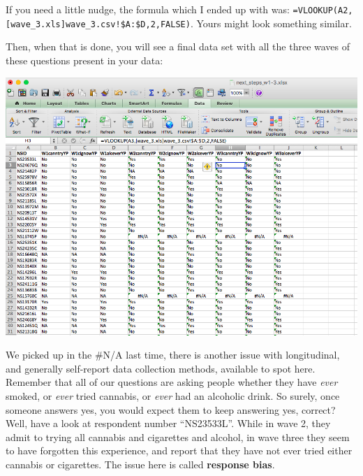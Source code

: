 \documentclass[]{book}
\theoremstyle{definition}
\theoremstyle{definition}
\theoremstyle{definition}
\theoremstyle{remark}
\begin{document}
If you need a little nudge, the formula which I ended up with was:
\texttt{=VLOOKUP(A2,{[}wave\_3.xls{]}wave\_3.csv!\$A:\$D,2,FALSE)}.
Yours might look something similar.

Then, when that is done, you will see a final data set with all the
three waves of these questions present in your data:

\includegraphics{imgs/merged_data_final.png}

We picked up in the \#N/A last time, there is another issue with
longitudinal, and generally self-report data collection methods,
available to spot here. Remember that all of our questions are asking
people whether they have \emph{ever} smoked, or \emph{ever} tried
cannabis, or \emph{ever} had an alcoholic drink. So surely, once someone
answers yes, you would expect them to keep answering yes, correct? Well,
have a look at respondent number ``NS23533L''. While in wave 2, they
admit to trying all cannabis and cigarettes and alcohol, in wave three
they seem to have forgotten this experience, and report that they have
not ever tried either cannabis or cigarettes. The issue here is called
\textbf{response bias}.
\end{document}
